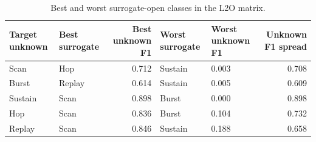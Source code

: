 \begin{table}
\caption{Best and worst surrogate-open classes in the L2O matrix.}
\label{tab:best_worst_surrogate}
\begin{tabular}{llrllr}
\toprule
Target unknown & Best surrogate & Best unknown F1 & Worst surrogate & Worst unknown F1 & Unknown F1 spread \\
\midrule
Scan & Hop & 0.712 & Sustain & 0.003 & 0.708 \\
Burst & Replay & 0.614 & Sustain & 0.005 & 0.609 \\
Sustain & Scan & 0.898 & Burst & 0.000 & 0.898 \\
Hop & Scan & 0.836 & Burst & 0.104 & 0.732 \\
Replay & Scan & 0.846 & Sustain & 0.188 & 0.658 \\
\bottomrule
\end{tabular}
\end{table}
